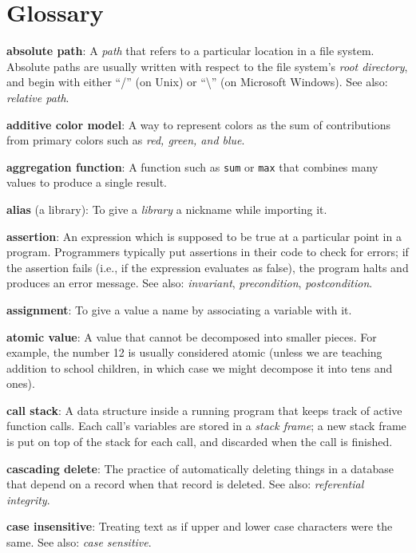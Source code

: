 \documentclass[]{book}
\newcommand{\gdef}[2]{\emph{#2}}
\begin{document}
\chapter{Glossary}\label{glossary}

\textbf{absolute path}: A \gdef{g:path}{path} that refers to a
particular location in a file system. Absolute paths are usually written
with respect to the file system's \gdef{g:root-directory}{root
directory}, and begin with either ``/'' (on Unix) or
``\textbackslash{}'' (on Microsoft Windows). See also:
\gdef{g:relative-path}{relative path}.

\textbf{additive color model}: A way to represent colors as the sum of
contributions from primary colors such as \gdef{g:rgb}{red, green,
and blue}.

\textbf{aggregation function}: A function such as \texttt{sum} or
\texttt{max} that combines many values to produce a single result.

\textbf{alias} (a library): To give a \gdef{g:library}{library} a
nickname while importing it.

\textbf{assertion}: An expression which is supposed to be true at a
particular point in a program. Programmers typically put assertions in
their code to check for errors; if the assertion fails (i.e., if the
expression evaluates as false), the program halts and produces an error
message. See also: \gdef{g:invariant}{invariant},
\gdef{g:precondition}{precondition},
\gdef{g:postcondition}{postcondition}.

\textbf{assignment}: To give a value a name by associating a variable
with it.

\textbf{atomic value}: A value that cannot be decomposed into smaller
pieces. For example, the number 12 is usually considered atomic (unless
we are teaching addition to school children, in which case we might
decompose it into tens and ones).

\textbf{call stack}: A data structure inside a running program that
keeps track of active function calls. Each call's variables are stored
in a \gdef{g:stack-frame}{stack frame}; a new stack frame is put on
top of the stack for each call, and discarded when the call is finished.

\textbf{cascading delete}: The practice of automatically deleting things
in a database that depend on a record when that record is deleted. See
also: \gdef{g:referential-integrity}{referential integrity}.

\textbf{case insensitive}: Treating text as if upper and lower case
characters were the same. See also: \gdef{g:case-sensitive}{case
sensitive}.
\end{document}
